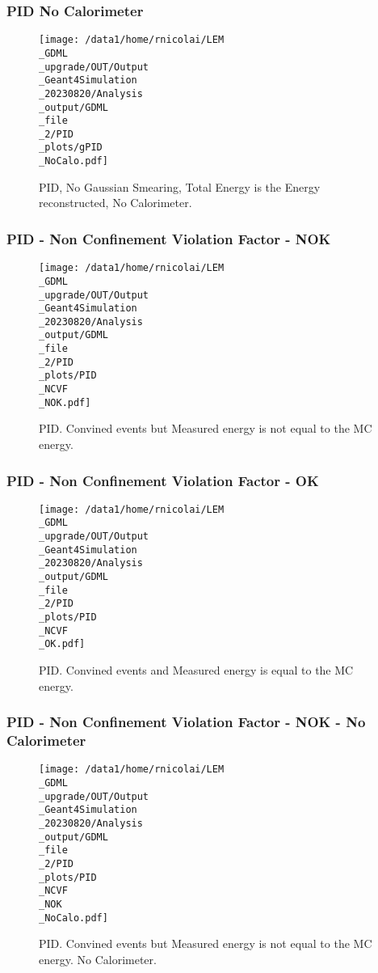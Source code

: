 \documentclass[8pt]{beamer}
\begin{document}
            \begin{frame}
                \frametitle{PID No Calorimeter}
            
        \begin{figure}[h]
            \centering
            \texttt{[image: /data1/home/rnicolai/LEM\\\_GDML\\\_upgrade/OUT/Output\\\_Geant4Simulation\\\_20230820/Analysis\\\_output/GDML\\\_file\\\_2/PID\\\_plots/gPID\\\_NoCalo.pdf]}
            \caption{PID, No Gaussian Smearing, Total Energy is the Energy reconstructed, No Calorimeter.}
        \end{figure}
        
            \end{frame}
            
            \begin{frame}
                \frametitle{PID - Non Confinement Violation Factor - NOK}
            
        \begin{figure}[h]
            \centering
            \texttt{[image: /data1/home/rnicolai/LEM\\\_GDML\\\_upgrade/OUT/Output\\\_Geant4Simulation\\\_20230820/Analysis\\\_output/GDML\\\_file\\\_2/PID\\\_plots/PID\\\_NCVF\\\_NOK.pdf]}
            \caption{PID. Convined events but Measured energy is not equal to the MC energy.}
        \end{figure}
        
            \end{frame}
            
            \begin{frame}
                \frametitle{PID - Non Confinement Violation Factor - OK}
            
        \begin{figure}[h]
            \centering
            \texttt{[image: /data1/home/rnicolai/LEM\\\_GDML\\\_upgrade/OUT/Output\\\_Geant4Simulation\\\_20230820/Analysis\\\_output/GDML\\\_file\\\_2/PID\\\_plots/PID\\\_NCVF\\\_OK.pdf]}
            \caption{PID. Convined events and Measured energy is equal to the MC energy.}
        \end{figure}
        
            \end{frame}
            
            \begin{frame}
                \frametitle{PID - Non Confinement Violation Factor - NOK - No Calorimeter}
            
        \begin{figure}[h]
            \centering
            \texttt{[image: /data1/home/rnicolai/LEM\\\_GDML\\\_upgrade/OUT/Output\\\_Geant4Simulation\\\_20230820/Analysis\\\_output/GDML\\\_file\\\_2/PID\\\_plots/PID\\\_NCVF\\\_NOK\\\_NoCalo.pdf]}
            \caption{PID. Convined events but Measured energy is not equal to the MC energy. No Calorimeter.}
        \end{figure}
        
            \end{frame}
            
\end{document}
